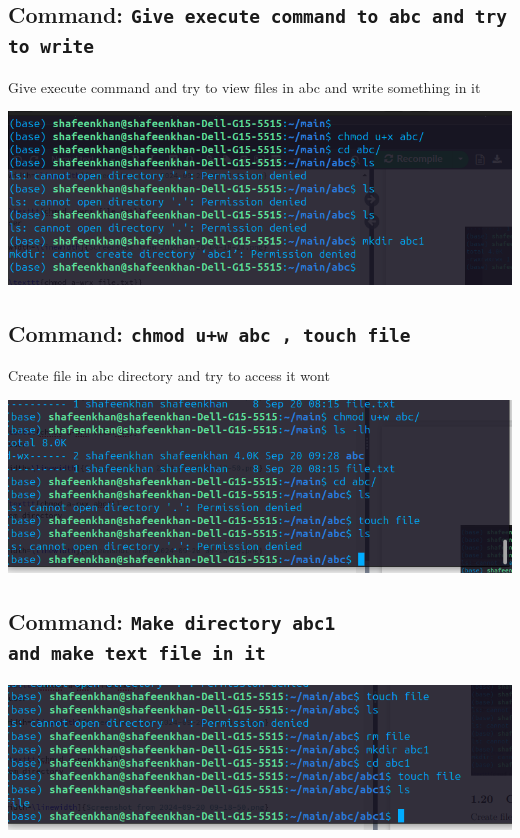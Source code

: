 \documentclass[a4paper,12pt]{article}
\begin{document}
\subsection{Command: \texttt{Give execute command to abc and try to write}}
Give execute command and try to view files in abc and write something in it
\begin{center}
    \includegraphics[width=\linewidth]{Screenshot from 2024-09-20 09-46-51.png}
\end{center}

\subsection{Command: \texttt{chmod u+w abc , touch file}}
Create file in abc directory and try to access it wont
\begin{center}
    \includegraphics[width=\linewidth]{Screenshot from 2024-09-20 09-51-09.png}
\end{center}

\subsection{Command: \texttt{Make directory abc1 \\ and make text file in it}}
\begin{center}
    \includegraphics[width=\linewidth]{Screenshot from 2024-09-20 09-52-39.png}
\end{center}
\end{document}
